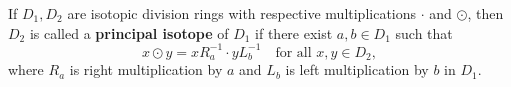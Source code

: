 If $D_1, D_2$ are isotopic division rings with respective multiplications $\cdot$ and $\odot$, then $D_2$ is called a \textbf{principal isotope} of $D_1$ if there exist $a, b \in D_1$ such that
$$x \odot y = xR_a^{-1} \cdot yL_b^{-1} \quad \text{for all } x, y \in D_2,$$
where $R_a$ is right multiplication by $a$ and $L_b$ is left multiplication by $b$ in $D_1$.
